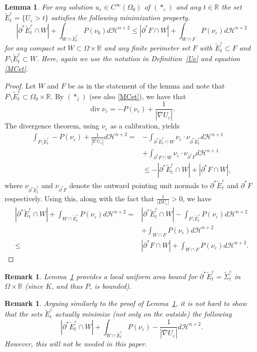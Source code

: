 \documentclass[11pt]{amsart}
\newtheorem{Lemma}[Theorem]{Lemma}
\newtheorem{Remark}[Theorem]{Remark}
\renewcommand{\epsilon}{\varepsilon}
\DeclareMathOperator{\dvg}{div} \DeclareMathOperator{\spt}{spt}
\def\R{\mathbb{R}}
\def\e{\epsilon}
\def\H{\mathcal{H}}
\def\wt{\widetilde}
\def\ov{\overline}
\begin{document}
\begin{Lemma} \label{emin} For any solution  $u_{\e}\in C^\infty(\Omega_0)$ of $(*_{\e})$ and any $t\in \R$  the set  $\wt E^{\e}_t=\{U_\e>t\}$ satisfies  the following minimization property.
\[|\partial^*\wt E_t^\e\cap W|+\int_{W\cap \wt E_t^\e} P(\nu_k)d\H^{n+2}\le |\partial^*F\cap W|+\int_{W\cap F} P(\nu_\e)d\H^{n+2}\]
for any compact set $W\subset \Omega\times\R$ and any finite perimeter set $F$ with $\wt E_t^\e\subset F$ and $F\setminus \wt E_t^\e\subset W$. Here, again we use the notation in Definition~\ref{Ue} and equation \eqref{MCet}.
\end{Lemma}
\begin{proof}
Let $W$ and $F$ be as in the statement of the lemma and note that $F\setminus\wt E_t^\e\subset\Omega_0\times\R$.
By $(*_{\hat \e})$ (see also \eqref{MCet}), we have that
\[\dvg \nu_\e= -P(\nu_\e)+\frac{1}{|\ov \nabla  U_{\e}|}.\]
 The divergence theorem, using $\nu_\e$ as a calibration, yields
\[\begin{split}\int_{F\setminus \wt E^\e_t}-P(\nu_\e)+\frac{1}{|\ov \nabla  U_{\e}|}d\H^{n+2}=&-\int_{\partial^* \wt E_t^\e\cap W}\nu_\e\cdot \nu_{\partial^* \wt E_t^\e}d\H^{n+1}\\
&+ \int_{\partial^* F\cap W}\nu_\e\cdot \nu_{\partial^* F}d\H^{n+1}\\
&\le-|\partial^*\wt E_t^\e\cap W|+|\partial^*F\cap W|,
\end{split}\]
where $\nu_{\partial^* \wt E_t^\e}$ and $\nu_{\partial^* F}$ denote the outward pointing unit normals to $\partial^* \wt E_t^\e$ and ${\partial^* F}$ respectively. Using this, along with the fact that $\frac{1}{|D U_{\e}|}>0$, we have
\[\begin{split}
|\partial^*\wt E_t^\e\cap W|+\int_{W\cap \wt E_t^\e} P(\nu_\e)d\H^{n+2}=&|\partial^*\wt E_t^\e\cap W|-\int_{F\setminus \wt E^\e_t} P(\nu_\e)d\H^{n+2}\\
&+\int_{W\cap F} P(\nu_\e)d\H^{n+2}\\
\le& |\partial^*F\cap W| +\int_{W\cap F} P(\nu_\e)d\H^{n+2}.
\end{split}\]
\end{proof}


\begin{Remark}\label{area bound}
Lemma~\ref{emin} provides  a local uniform  area bound for $\partial^*\wt E^\e_t=\wt\Sigma^\e_t$  in $\Omega\times\R$ (since $K$, and thus $P$, is bounded). 
\end{Remark}

\begin{Remark}\label{minimrmk}
Arguing similarly to the proof of Lemma~\ref{emin}, it is not hard to show that the sets $\wt E_t^\e$ actually minimize (not only on the outside) the following
\[|\partial^*\wt E_t^\e\cap W|+\int_{W\cap \wt E_t^\e} P(\nu_\e)-\frac{1}{|\ov \nabla U_{\e}|}d\H^{n+2}.\]
However, this will not be needed in this paper.
\end{Remark}
\end{document}
